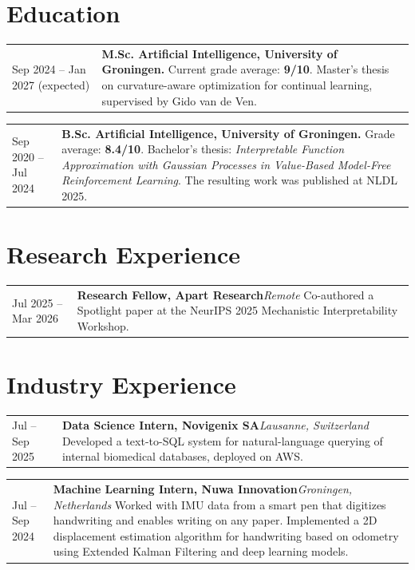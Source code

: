 \documentclass[10pt,a4paper]{article}
\makeatletter
\newcommand{\datedentry}[2]{%
  \begin{tabularx}{\textwidth}{@{}>{\raggedright\arraybackslash}p{3.3cm}@{\hspace{0.15cm}}X@{}}
    #1 & #2
  \end{tabularx}%
}
\makeatother
\begin{document}
\section{Education}
\datedentry{Sep 2024 -- Jan 2027 (expected) }{\textbf{M.Sc. Artificial Intelligence, University of Groningen.}\newline
Current grade average: \textbf{9/10}.\newline
Master's thesis on curvature-aware optimization for continual learning, supervised by Gido van de Ven.
}
\vspace{2pt}
\datedentry{Sep 2020 -- Jul 2024}{\textbf{B.Sc. Artificial Intelligence, University of Groningen.}\newline
Grade average: \textbf{8.4/10}.\newline
Bachelor's thesis: \textit{Interpretable Function Approximation with Gaussian Processes in Value-Based Model-Free Reinforcement Learning}.
The resulting work was published at NLDL 2025.}

\section{Research Experience}
\datedentry{Jul 2025 -- Mar 2026}{\textbf{Research Fellow, Apart Research}\hfill\textit{Remote}\newline
Co-authored a Spotlight paper at the
NeurIPS 2025 Mechanistic Interpretability Workshop.}

\section{Industry Experience}
\datedentry{Jul -- Sep 2025}{\textbf{Data Science Intern, Novigenix SA}\hfill\textit{Lausanne, Switzerland}\newline
Developed a text-to-SQL system for natural-language querying of internal
biomedical databases, deployed on AWS.}
\vspace{2pt}
\datedentry{Jul -- Sep 2024}{\textbf{Machine Learning Intern, Nuwa Innovation}\hfill\textit{Groningen, Netherlands}\newline
Worked with IMU data from a smart pen that digitizes handwriting and enables writing on any paper.
Implemented a 2D displacement estimation algorithm for handwriting based on
odometry using Extended Kalman Filtering and deep learning models.}
\end{document}
